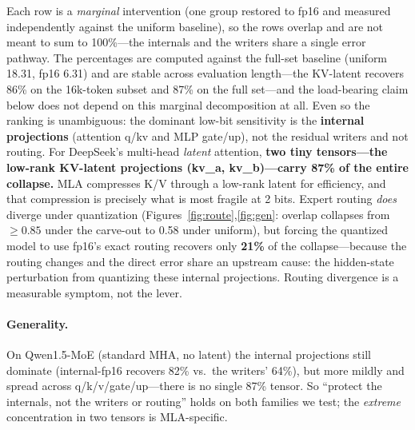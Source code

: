 \documentclass[10pt]{article}
\begin{document}
Each row is a \emph{marginal} intervention (one group restored to fp16 and measured independently against
the uniform baseline), so the rows overlap and are not meant to sum to 100\%---the internals and the
writers share a single error pathway. The percentages are computed against the full-set baseline (uniform
18.31, fp16 6.31) and are stable across evaluation length---the KV-latent recovers 86\% on the 16k-token
subset and 87\% on the full set---and the load-bearing claim below does not depend on this marginal
decomposition at all. Even so the ranking is unambiguous: the dominant low-bit
sensitivity is the \textbf{internal projections} (attention q/kv and MLP gate/up), not the residual
writers and not routing. For DeepSeek's multi-head
\emph{latent} attention, \textbf{two tiny tensors---the low-rank KV-latent projections (kv\_a, kv\_b)---carry
87\% of the entire collapse.} MLA compresses K/V through a low-rank latent for efficiency, and that
compression is precisely what is most fragile at 2 bits. Expert routing \emph{does} diverge under
quantization (Figures~\ref{fig:route},\ref{fig:gen}: overlap collapses from $\geq0.85$ under the
carve-out to 0.58 under uniform), but forcing the quantized model to use fp16's exact routing recovers
only \textbf{21\%} of the collapse---because the routing changes and the direct error share an upstream
cause: the hidden-state perturbation from quantizing these internal projections. Routing divergence is a
measurable symptom, not the lever.

\paragraph{Generality.}
On Qwen1.5-MoE (standard MHA, no latent) the internal projections still dominate (internal-fp16 recovers
82\% vs.\ the writers' 64\%), but more mildly and spread across q/k/v/gate/up---there is no single 87\%
tensor. So ``protect the internals, not the writers or routing'' holds on both families we test; the
\emph{extreme} concentration in two tensors is MLA-specific.
\end{document}
